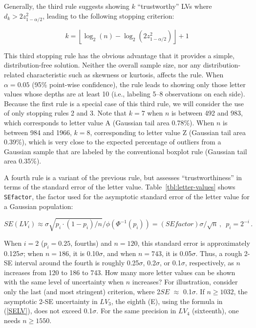 \documentclass[12pt,oneside]{article}
\begin{document}
Generally, the third rule suggests showing $k$ ``trustworthy'' LVs where $d_k > 2 z_{1-\alpha/2}^2 $, leading to the following stopping criterion:

\begin{equation}
k =  \left \lfloor \log_2 (n) - \log_2 
   \left(2  z_{1-\alpha/2}^2 \right) \right \rfloor + 1
\end{equation}

\noindent This third stopping rule has the obvious advantage that it provides a simple, distribution-free solution. Neither the overall sample size, nor any distribution-related characteristic such as skewness or kurtosis, affects the rule. When $\alpha = 0.05$ (95\% point-wise confidence), the rule leads to showing only those letter values whose depths are at least 10 (i.e., labeling 5--8 observations on each side). Because the first rule is a special case of this third rule, we will consider the use of only stopping rules 2 and 3. Note that $k = 7$ when $n$ is between 492 and 983, which corresponds to letter value A (Gaussian tail area 0.78\%). When $n$ is between 984 and 1966, $k = 8$, corresponding to letter value Z (Gaussian tail area 0.39\%), which is very close to the expected percentage of outliers from a Gaussian sample that are labeled by the conventional boxplot rule (Gaussian tail area 0.35\%).


A fourth rule is a variant of the previous rule, but assesses ``trustworthiness'' in terms of the standard error of the letter value. Table~\ref{tbl:letter-values} shows \texttt{SEfactor}, the factor used for the asymptotic standard error of the letter value for a Gaussian population:

\begin{equation}
SE(LV_i) \approx \sigma \sqrt{p_i \cdot (1 - p_i)/ n} / \phi(\Phi^{-1}(p_i)) 
 = (SEfactor) \sigma / \sqrt{n} \, ,
 \, \, \, p_i = 2^{-i} \, .
\label{SELV}
\end{equation}

\noindent When $i = 2$ ($p_i = 0.25$, fourths) and $n = 120$, this standard error is approximately 0.125$\sigma$; when $n = 186$, it is 0.10$\sigma$, and when $n = 743$, it is 0.05$\sigma$. Thus, a rough 2-SE interval around the fourth is roughly 0.25$\sigma$, 0.2$\sigma$, or 0.1$\sigma$, respectively, as $n$ increases from 120 to 186 to 743. How many more letter values can be shown with the same level of uncertainty when $n$ increases? For illustration, consider only the last (and most stringent) criterion, where 2$SE$ $\approx$ 0.1$\sigma$. If $n \geq 1032$, the asymptotic 2-SE uncertainty in $LV_3$, the eighth (E), using the formula in (\ref{SELV}), does not exceed 0.1$\sigma$. For the same precision in $LV_4$ (sixteenth), one needs $n \geq 1550$.
\end{document}
